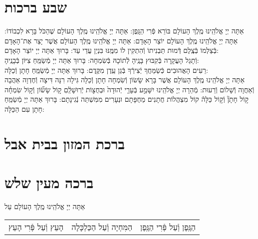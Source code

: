 \documentclass[twoside, openany, parskip=half, 11pt]{book}
\begin{document}
\section[שבע ברכות]{ שבע ברכות }

אַתָּה יְיָ אֱלֹהֵֽינוּ מֶֽלֶךְ הָעוֹלָם בּוֹרֵא פְּֿרִי הַגָּֽפֶן:\hfill \break
{}
אַתָּה יְיָ אֱלֹהֵֽינוּ מֶֽלֶךְ הָעוֹלָם שֶׁהַכֹּל בָּרָא לִכְבוֹדוֹ:\hfill \break
{}
אַתָּה יְיָ אֱלֹהֵֽינוּ מֶֽלֶךְ הָעוֹלָם יוֹצֵר הָאָדָם:\hfill \break
{}
אַתָּה יְיָ אֱלֹהֵֽינוּ מֶֽלֶךְ הָעוֹלָם אֲשֶׁר יָצַר אֶת־הָאָדָם בְּֿצַלְמוֹ
בְּֿצֶֽלֶם דְּֿמוּת תַּבְנִיתוֹ וְֿהִתְקִין לוֹ מִמֶּֽנּוּ בִּנְיַן עֲדֵי עַד: בָּרוּךְ אַתָּה יְיָ יוֹצֵר הָאָדָם:\\
וְֿתָגֵל הָעֲקָרָה בְּֿקִבּוּץ בָּנֶֽיהָ לְֿתוֹכָהּ בְּֿשִׂמְחָה:
בָּרוּךְ אַתָּה יְיָ מְֿשַׂמֵּֽחַ צִיּוֹן בְּֿבָנֶֽיהָ:\\
רֵעִים הָאֲהוּבִים כְּֿשַׂמֵּחֲךָ יְֿצִירְֿךָ בְּֿגַן עֵֽדֶן מִקֶּֽדֶם:
בָּרוּךְ אַתָּה יְיָ מְֿשַׂמֵּֽחַ חָתָן וְֿכַלָּה:\\
אַתָּה יְיָ אֱלֹהֵֽינוּ מֶֽלֶךְ הָעוֹלָם
אֲשֶׁר בָּרָא שָׂשׂוֹן וְֿשִׂמְחָה חָתָן וְֿכַלָּה גִּילָה רִנָּה דִּיצָה וְֿחֶדְוָה
אַהֲבָה וְֿאַחֲוָה וְֿשָׁלוֹם וְֿרֵעוּת:
מְֿהֵרָה יְיָ אֱלֹהֵֽינוּ יִשָּׁמַ֣ע
בְּֿעָרֵ֤י יְֿהוּדָה֙ וּבְחֻצ֣וֹת יְֿרֽוּשָׁלַֽ֔םִ
ק֣וֹל שָׂשׂ֞וֹן וְֿק֣וֹל שִׂמְחָ֗ה ק֣וֹל חָתָן֘ וְֿק֣וֹל כַּלָּה֒
קוֹל מִצְהֲלוֹת חֲתָנִים מֵחֻפָּתָם וּנְעָרִים מִמִּשְׁתֵּה נְֿגִינָתָם:
בָּרוּךְ אַתָּה יְיָ מְֿשַׂמֵּֽחַ חָתָן עִם הַכַּלָּה:


\nextpage

\section[ברכת המזון בבית אבל]{ ברכת המזון בבית אבל }

\section[ברכה מעין שלש]{ ברכה מעין שלש }


אַתָּה יְיָ אֱלֹהֵֽינוּ מֶֽלֶךְ הָעוֹלָם עַל

\begin{tabular}{>{\centering\arraybackslash}m{} | >{\centering\arraybackslash}m{} | >{\centering\arraybackslash}m{}}

הָעֵץ וְֿעַל פְּֿרִי הָעֵץ
&
הַמִּחְיָה וְֿעַל הַכַּלְכָּלָה
&
הַגֶּֽפֶן וְֿעַל פְּֿרִי הַגֶּֽפֶן \\

\end{tabular}
\end{document}
